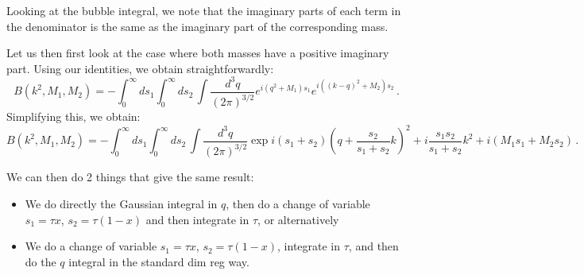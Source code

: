 \documentclass[twoside]{article}
\begin{document}
Looking at the bubble integral, we note that the imaginary parts of each term in the denominator is the same as the imaginary part of the corresponding mass. 

Let us then first look at the case where both masses have a positive imaginary part. Using our identities, we obtain straightforwardly:
\begin{equation}
B(k^2,M_1,M_2)= - \int_0^\infty ds_1 \int_0^\infty ds_2\,\int \frac{d^3q}{(2\pi)^{3/2}} e^{i(q^2+M_1)s_1}e^{i((k-q)^2+M_2)s_2}\,.
\end{equation}
Simplifying this, we obtain:
\begin{equation}
B(k^2,M_1,M_2)= - \int_0^\infty ds_1 \int_0^\infty ds_2\,\int \frac{d^3q}{(2\pi)^{3/2}} \exp{i(s_1+s_2)(q+ \frac{s_2}{s_1+s_2}k)^2+i\frac{s_1 s_2}{s_1+s_2}k^2+ i (M_1 s_1 +M_2 s_2)}\,.
\end{equation}

We can then do 2 things that give the same result:
\begin{itemize}
\item We do directly the Gaussian integral in $q$, then do a change of variable $s_1 = \tau x$, $s_2 = \tau (1-x)$ and then integrate in $\tau$, or alternatively
\item We do a change of variable $s_1 = \tau x$, $s_2 = \tau (1-x)$, integrate in $\tau$, and then do the $q$ integral in the standard dim reg way.
\end{itemize} 
\end{document}
